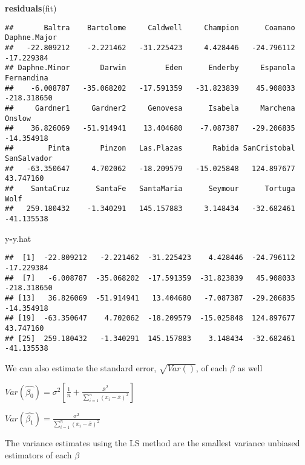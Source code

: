 \documentclass[
]{article}
\newenvironment{Shaded}{\begin{snugshade}}{\end{snugshade}}
\newcommand{\FunctionTok}[1]{\textcolor[rgb]{0.13,0.29,0.53}{\textbf{#1}}}
\newcommand{\NormalTok}[1]{#1}
\newcommand{\SpecialCharTok}[1]{\textcolor[rgb]{0.81,0.36,0.00}{\textbf{#1}}}
\begin{document}
\begin{Shaded}
\begin{Highlighting}[]
\FunctionTok{residuals}\NormalTok{(fit)}
\end{Highlighting}
\end{Shaded}

\begin{verbatim}
##       Baltra    Bartolome     Caldwell     Champion      Coamano Daphne.Major 
##   -22.809212    -2.221462   -31.225423     4.428446   -24.796112   -17.229384 
## Daphne.Minor       Darwin         Eden      Enderby     Espanola   Fernandina 
##    -6.008787   -35.068202   -17.591359   -31.823839    45.908033  -218.318650 
##     Gardner1     Gardner2     Genovesa      Isabela     Marchena       Onslow 
##    36.826069   -51.914941    13.404680    -7.087387   -29.206835   -14.354918 
##        Pinta       Pinzon   Las.Plazas       Rabida SanCristobal  SanSalvador 
##   -63.350647     4.702062   -18.209579   -15.025848   124.897677    43.747160 
##    SantaCruz      SantaFe   SantaMaria      Seymour      Tortuga         Wolf 
##   259.180432    -1.340291   145.157883     3.148434   -32.682461   -41.135538
\end{verbatim}

\begin{Shaded}
\begin{Highlighting}[]
\NormalTok{y}\SpecialCharTok{{-}}\NormalTok{y.hat}
\end{Highlighting}
\end{Shaded}

\begin{verbatim}
##  [1]  -22.809212   -2.221462  -31.225423    4.428446  -24.796112  -17.229384
##  [7]   -6.008787  -35.068202  -17.591359  -31.823839   45.908033 -218.318650
## [13]   36.826069  -51.914941   13.404680   -7.087387  -29.206835  -14.354918
## [19]  -63.350647    4.702062  -18.209579  -15.025848  124.897677   43.747160
## [25]  259.180432   -1.340291  145.157883    3.148434  -32.682461  -41.135538
\end{verbatim}

We can also estimate the standard error, \(\sqrt{Var()}\), of each
\(\beta\) as well

\(Var(\hat{\beta_0}) = \sigma^2[\frac{1}{n} + \frac{\bar{x}^2}{\sum_{i=1}^n(x_i-\bar{x})^2}]\)

\(Var(\hat{\beta_1}) = \frac{\sigma^2}{\sum_{i=1}^n(x_i-\bar{x})^2}\)

The variance estimates using the LS method are the smallest variance
unbiased estimators of each \(\beta\)
\end{document}
